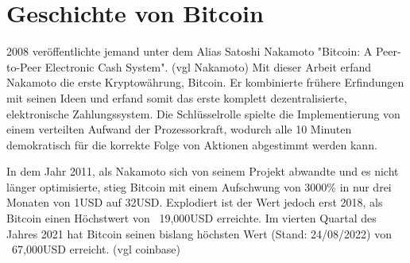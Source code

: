\section{Geschichte von Bitcoin}
2008 veröffentlichte jemand unter dem Alias Satoshi Nakamoto "Bitcoin: A Peer-to-Peer Electronic Cash System". (vgl Nakamoto) 
Mit dieser Arbeit erfand Nakamoto die erste Kryptowährung, Bitcoin. Er kombinierte frühere Erfindungen mit seinen Ideen und 
erfand somit das erste komplett dezentralisierte, elektronische Zahlungssystem. Die Schlüsselrolle spielte die Implementierung 
von einem verteilten Aufwand der Prozessorkraft, wodurch alle 10 Minuten demokratisch für die korrekte Folge von Aktionen 
abgestimmt werden kann.

In dem Jahr 2011, als Nakamoto sich von seinem Projekt abwandte und es nicht länger optimisierte, stieg Bitcoin mit einem
Aufschwung von 3000\% in nur drei Monaten von 1USD auf 32USD. Explodiert ist der Wert jedoch erst 2018, als Bitcoin einen
Höchstwert von ~19,000USD erreichte. Im vierten Quartal des Jahres 2021 hat Bitcoin seinen bislang höchsten Wert (Stand: 24/08/2022)
von ~67,000USD erreicht. (vgl coinbase)